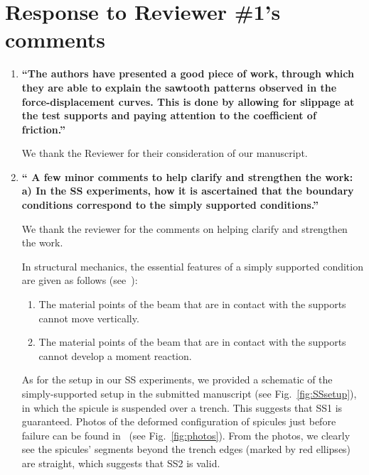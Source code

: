 \documentclass[11pt,letterpaper]{report}
\begin{document}
\clearpage
\section*{Response to Reviewer \#1's comments}
\label{rev1}

\begin{enumerate}[label=\textit{1.\arabic*},wide, labelwidth=!, labelindent=0pt]

\item \label{r1c1} {\bf ``The authors have presented a good piece of work, through which they are able to explain the sawtooth patterns observed in the force-displacement curves. This is done by allowing for slippage at the test supports and paying attention to the coefficient of friction.''}

We thank the Reviewer for their consideration of our manuscript.

\newpage
\item \label{r1c2} {\bf `` A few minor comments to help clarify and strengthen the work: a) In the SS experiments, how it is ascertained that the boundary conditions correspond to the simply supported conditions.''}

We thank the reviewer for the comments on helping clarify and strengthen the work.

In structural mechanics, the essential features of a simply supported condition are given as follows (see~\cite{gere1997mechanics}):
\begin{enumerate}[label=\textit{(SS\arabic*).},leftmargin = 1.5 cm]
\item The material points of the beam that are in contact with the supports cannot move vertically.
\item The material points of the beam that are in contact with the supports cannot develop a moment reaction.
\end{enumerate}


As for the setup in our SS experiments, we provided a schematic of the simply-supported setup in the submitted manuscript (see Fig.~\ref{fig:SSsetup}), in which the spicule is suspended over a trench. This suggests that SS1 is guaranteed. Photos of the deformed configuration of spicules just before failure can be found in~\cite{monn2017enhanced} (see Fig.~\ref{fig:photos}). From the photos, we clearly see the spicules' segments beyond the trench edges (marked by red ellipses) are straight, which suggests that SS2 is valid.


\end{enumerate}
\end{document}
